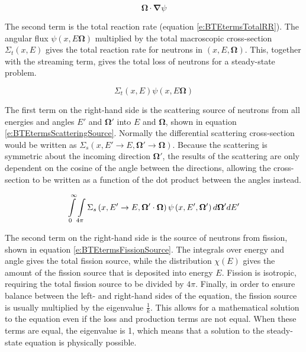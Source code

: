 \begin{equation}\label{e:BTEtermsStreaming}
\bm \Omega \cdot \bm \nabla \psi
\end{equation}

The second term is the total reaction rate (equation \ref{e:BTEtermsTotalRR}).  The angular flux $\psi\left(x,E\bm\Omega\right)$ multiplied by the total macroscopic cross-section $\Sigma_t\left(x,E\right)$ gives the total reaction rate for neutrons in $\left(x,E,\bm\Omega\right)$.  This, together with the streaming term, gives the total loss of neutrons for a steady-state problem.

\begin{equation}\label{e:BTEtermsTotalRR}
\Sigma_t\left(x,E\right)\psi\left(x,E\bm\Omega\right)
\end{equation}

The first term on the right-hand side is the scattering source of neutrons from all energies and angles $E'$ and $\bm\Omega'$ into $E$ and $\bm\Omega$, shown in equation \ref{e:BTEtermsScatteringSource}.  Normally the differential scattering cross-section would be written as $\Sigma_s\left(x,E'\rightarrow E,\bm\Omega'\rightarrow\bm\Omega\right)$.  Because the scattering is symmetric about the incoming direction $\bm\Omega'$, the results of the scattering are only dependent on the cosine of the angle between the directions, allowing the cross-section to be written as a function of the dot product between the angles instead.

\begin{equation}\label{e:BTEtermsScatteringSource}
\intop_0^{\infty} \intop_{4\pi} \Sigma_s\left(x,E' \rightarrow E, \bm \Omega' \cdot \bm \Omega\right) \psi\left(x,E',\bm \Omega'\right) d\bm \Omega' dE'
\end{equation}

The second term on the right-hand side is the source of neutrons from fission, shown in equation \ref{e:BTEtermsFissionSource}.  The integrals over energy and angle gives the total fission source, while the distribution $\chi\left(E\right)$ gives the amount of the fission source that is deposited into energy $E$.  Fission is isotropic, requiring the total fission source to be divided by $4\pi$.  Finally, in order to ensure balance between the left- and right-hand sides of the equation, the fission source is usually multiplied by the eigenvalue $\frac{1}{k}$.  This allows for a mathematical solution to the equation even if the loss and production terms are not equal.  When these terms are equal, the eigenvalue is 1, which means that a solution to the steady-state equation is physically possible.

